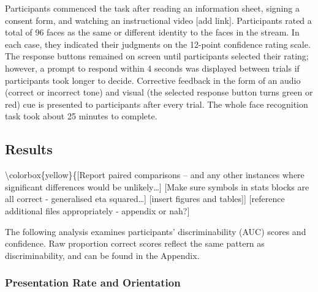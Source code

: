 \documentclass[
  english,
  man]{apa6}
\begin{document}
Participants commenced the task after reading an information sheet, signing a consent form, and watching an instructional video {[}add link{]}. Participants rated a total of 96 faces as the same or different identity to the faces in the stream. In each case, they indicated their judgments on the 12-point confidence rating scale. The response buttons remained on screen until participants selected their rating; however, a prompt to respond within 4 seconds was displayed between trials if participants took longer to decide. Corrective feedback in the form of an audio (correct or incorrect tone) and visual (the selected response button turns green or red) cue is presented to participants after every trial. The whole face recognition task took about 25 minutes to complete.

\hypertarget{results}{%
\subsection{Results}\label{results}}

\textbackslash colorbox\{yellow\}\{{[}Report paired comparisons -- and any other instances where significant differences would be unlikely\ldots{]}
{[}Make sure symbols in stats blocks are all correct - generalised eta squared\ldots{]}
{[}insert figures and tables{]}{]}
{[}reference additional files appropriately - appendix or nah?{]}

The following analysis examines participants' discriminability (AUC) scores and confidence. Raw proportion correct scores reflect the same pattern as discriminability, and can be found in the Appendix.

\hypertarget{presentation-rate-and-orientation}{%
\subsubsection{Presentation Rate and Orientation}\label{presentation-rate-and-orientation}}
\end{document}

